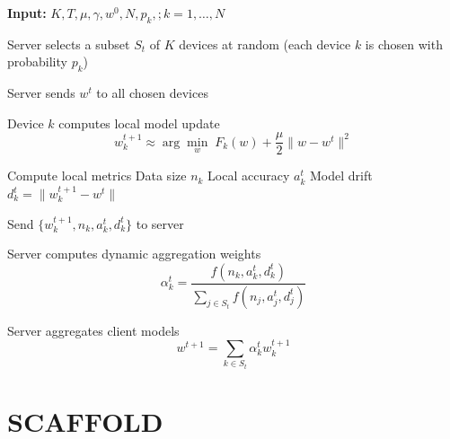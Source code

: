 \documentclass[12pt]{book}
\begin{document}
\begin{algorithm}[H]
\caption{FedProx with Dynamic Weighted Aggregation}
\label{alg:fedprox_dynamic}
\begin{algorithmic}[H]
\STATE \textbf{Input:} $K, T, \mu, \gamma, w^0, N, p_k,; k=1,\dots,N$


\STATE Server selects a subset $S_t$ of $K$ devices at random
\STATE \hspace{0.5cm}(each device $k$ is chosen with probability $p_k$)

\STATE Server sends $w^t$ to all chosen devices


    \STATE Device $k$ computes local model update
    \[
    w_k^{t+1} \approx 
    \arg\min_{w} \; F_k(w) + \frac{\mu}{2}\|w - w^t\|^2
    \]

    \STATE Compute local metrics
    \STATE \hspace{0.5cm}Data size $n_k$
    \STATE \hspace{0.5cm}Local accuracy $a_k^t$
    \STATE \hspace{0.5cm}Model drift $d_k^t = \|w_k^{t+1} - w^t\|$

    \STATE Send $\{w_k^{t+1}, n_k, a_k^t, d_k^t\}$ to server

\ENDFOR

\STATE Server computes dynamic aggregation weights
\[
\alpha_k^t =
\frac{f(n_k, a_k^t, d_k^t)}
{\sum_{j \in S_t} f(n_j, a_j^t, d_j^t)}
\]

\STATE Server aggregates client models
\[
w^{t+1} =
\sum_{k \in S_t} \alpha_k^t w_k^{t+1}
\]

\ENDFOR
\end{algorithmic}
\end{algorithm}

\section{SCAFFOLD}
\end{document}
